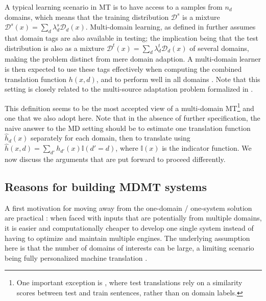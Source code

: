 \documentclass[11pt,a4paper]{article}
\newcommand{\fyTodo}[1]{\Todo[FY:]{\textcolor{orange}{#1}}}
\newcommand{\indic}[1]{\ensuremath{\mathbb{I}(#1)}}
\begin{document}
A typical learning scenario in MT is to have access to a samples from $n_d$ domains, which means that the training distribution $\mathcal{D}^s$ is a mixture $\mathcal{D}^s(x) = \sum_d \lambda^{s}_{d} \mathcal{D}_d(x)$. Multi-domain learning, as defined in \cite{Dredze08online} further assumes that domain tags are also available in testing; the implication being that the test distribution is also as a mixture $\mathcal{D}^t(x) = \sum_d \lambda^{t}_{d} \mathcal{D}_d(x)$ of several domains, making the problem distinct from mere domain adaption.  A multi-domain learner is then expected to use these tags effectively \cite{Joshi12multidomain} when computing the combined translation function $h(x,d)$, and to perform well in all domains \cite{Finkel09hierarchical}. Note that this setting is closely related to the multi-source adaptation problem formalized in \cite{Mansour09domainadaptation,Mansour09multiple,Hoffman18algorithms}.

This definition seems to be the most accepted view of a multi-domain MT\footnote{One important exception is \cite{Farajian17multidomain}, where test translations rely on a similarity scores between test and train sentences, rather than on domain labels.} and one that we also adopt here. Note that in the absence of further specification, the naive answer to the MD setting should be to estimate one translation function $\hat{h}_d(x)$ separately for each domain, then to translate using $\hat{h}(x,d) = \sum_{d'} h_{d'}(x) \indic{d' = d}$, where $\indic{x}$ is the indicator function. We now discuss the arguments that are put forward to proceed differently.


\subsection{Reasons for building MDMT systems \label{ssec:whymdmt}}

A first motivation for moving away from the one-domain / one-system solution are practical  \cite{Sennrich13multidomain,Farajian17neural}: when faced with inputs that are potentially from multiple domains, it is easier and computationally cheaper to develop one single system instead of having to optimize and maintain multiple engines. The underlying assumption here is that the number of domains of interests can be large, a limiting scenario being fully personalized machine translation \cite{Michel2018extreme}.
\end{document}
